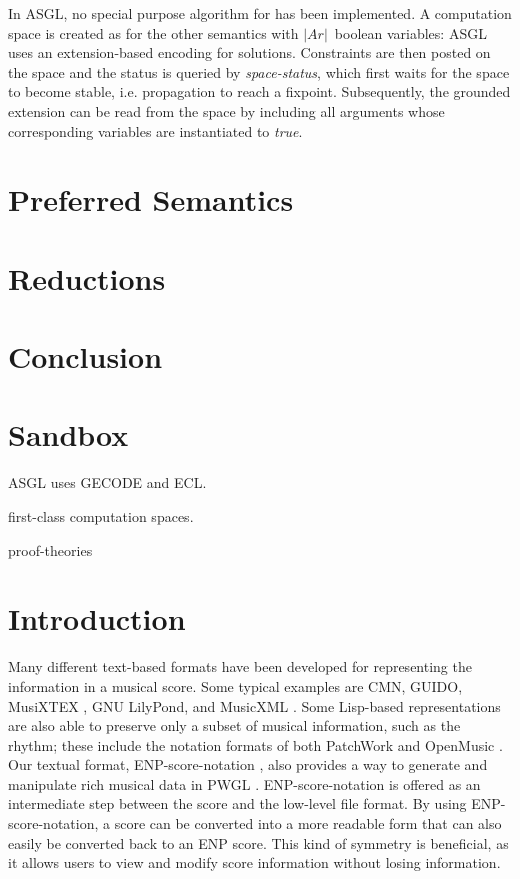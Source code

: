 \documentclass[runningheads,a4paper]{llncs}
\begin{document}
In ASGL, no special purpose algorithm for \grsem{} has been
implemented. A computation space is created as for the other semantics
with $|Ar|$~boolean variables: ASGL uses an extension-based encoding
for solutions. Constraints are then posted on the space and the status
is queried by \textit{space-status}, which first waits for the space
to become stable, i.e. propagation to reach a fixpoint. Subsequently,
the grounded extension can be read from the space by including all
arguments whose corresponding variables are instantiated to
\textit{true}.

\section{Preferred Semantics}\label{sec:preferred}

\section{Reductions}\label{sec:reductions}

\section{Conclusion}\label{sec:conclusion}


\section{Sandbox}\label{sec:sandbox}
ASGL\cite{asgl} uses GECODE\cite{gecode} and ECL\cite{ecl}.


first-class computation spaces\cite{Engines:97}.

proof-theories \cite{Modgil2009}


\section{Introduction}\label{old:sec:introduction}
Many different text-based formats have been developed for representing
the information in a musical score. Some typical examples are CMN,
GUIDO, MusiXTEX \cite{agon}, GNU LilyPond\cite{agon}, and
MusicXML \cite{agon}. Some Lisp-based representations are also
able to preserve only a subset of musical information, such as the
rhythm; these include the notation formats of both PatchWork \cite{agon}
and OpenMusic \cite{agon}. Our textual format, ENP-score-notation
\cite{agon}, also provides a way to generate and manipulate rich
musical data in PWGL \cite{agon}.  ENP-score-notation is offered as an
intermediate step between the score and the low-level file format. By
using ENP-score-notation, a score can be converted into a more
readable form that can also easily be converted back to an ENP
score. This kind of symmetry is beneficial, as it allows users to view
and modify score information without losing information.
\end{document}
